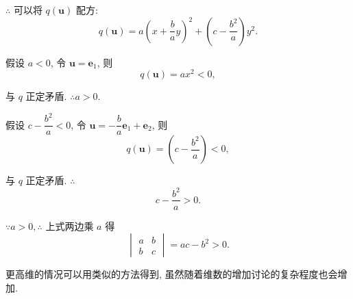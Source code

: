 \documentclass{ctexart}
\begin{document}
$\therefore$ 可以将 $q(\boldsymbol{u})$ 配方:
\begin{equation}\label{eq3.2}
    q(\boldsymbol{u})=a\left(x+\dfrac{b}{a}y\right)^2+\left(c-\dfrac{b^2}{a}\right)y^2.
\end{equation}

假设 $a<0$, 令 $\boldsymbol{u}=\boldsymbol{e}_1$, 则
\[q(\boldsymbol{u})=ax^2<0,\]

与 $q$ 正定矛盾. $\therefore a>0$.

假设 $c-\dfrac{b^2}{a}<0$, 令 $\boldsymbol{u}=-\dfrac{b}{a}\boldsymbol{e}_1+\boldsymbol{e}_2$, 则
\[q(\boldsymbol{u})=\left(c-\dfrac{b^2}{a}\right)<0,\]

与 $q$ 正定矛盾. $\therefore$
\[c-\dfrac{b^2}{a}>0.\]

$\because a>0,\therefore$ 上式两边乘 $a$ 得
\[\begin{vmatrix}
    a & b \\
    b & c
\end{vmatrix}=ac-b^2>0.\]

更高维的情况可以用类似的方法得到, 虽然随着维数的增加讨论的复杂程度也会增加.
\end{document}
